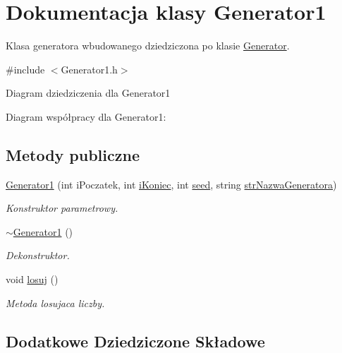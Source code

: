 \hypertarget{classGenerator1}{\section{Dokumentacja klasy Generator1}
\label{classGenerator1}
}


Klasa generatora wbudowanego dziedziczona po klasie \hyperlink{classGenerator}{Generator}.  




{\ttfamily \#include $<$Generator1.\+h$>$}



Diagram dziedziczenia dla Generator1


Diagram współpracy dla Generator1\+:
\subsection*{Metody publiczne}
\begin{DoxyCompactItemize}
\item 
\hyperlink{classGenerator1_a872bdaaf9e8bea3527f0e2c6908a7254}{Generator1} (int i\+Poczatek, int \hyperlink{classGenerator_a235b3d02ce62d19e803cc2295eb7911e}{i\+Koniec}, int \hyperlink{classGenerator_ae77446ccb4946b8eb28d0f20f3e4a95f}{seed}, string \hyperlink{classGenerator_a7e2c131c26baf31bb3f072115c619d1c}{str\+Nazwa\+Generatora})
\begin{DoxyCompactList}\small\item\em Konstruktor parametrowy. \end{DoxyCompactList}\item 
\hypertarget{classGenerator1_ad087f9ed8e1630e064f6a0a06e59415c}{\hyperlink{classGenerator1_ad087f9ed8e1630e064f6a0a06e59415c}{$\sim$\+Generator1} ()}\label{classGenerator1_ad087f9ed8e1630e064f6a0a06e59415c}

\begin{DoxyCompactList}\small\item\em Dekonstruktor. \end{DoxyCompactList}\item 
void \hyperlink{classGenerator1_a4b00ed3593e4be47a2101e0a027dfea6}{losuj} ()
\begin{DoxyCompactList}\small\item\em Metoda losujaca liczby. \end{DoxyCompactList}\end{DoxyCompactItemize}
\subsection*{Dodatkowe Dziedziczone Składowe}


